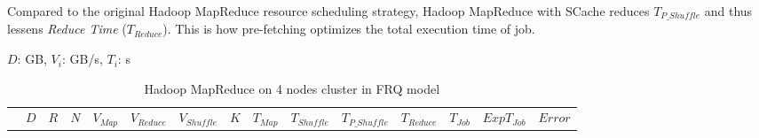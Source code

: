 {%


Compared to the original Hadoop MapReduce resource scheduling strategy, Hadoop MapReduce with SCache reduces \(T_{P\_Shuffle}\) and thus lessens \textit{Reduce Time} (\(T_{Reduce}\)). This is how pre-fetching optimizes the total execution time of job.


\begin{table}[!t]
\renewcommand{\arraystretch}{1.3}
\caption{\color{blue}Hadoop MapReduce on 4 nodes cluster in FRQ model}
\label{table1}
\centering
\(D\): GB, \(V_{i}\): GB/s, \(T_{i}\): s
\begin{tabular}{|c||c|c|c|c|c|c|c||c|c|c|c|c|c|c|}
\hline
 &
\(D\) &	
\(R\) &	
\(N\) &	
\(V_{Map}\) &	
\(V_{Reduce}\) &	
\(V_{Shuffle}\) &	
\(K\) &	
\(T_{Map}\) &	
\(T_{Shuffle}\) &	
\(T_{P\_Shuffle}\) &
\(T_{Reduce}\) & 
\(T_{Job}\) & 
\(Exp T_{Job}\) &
\(Error\)\\


\end{tabular}
\end{table}}
